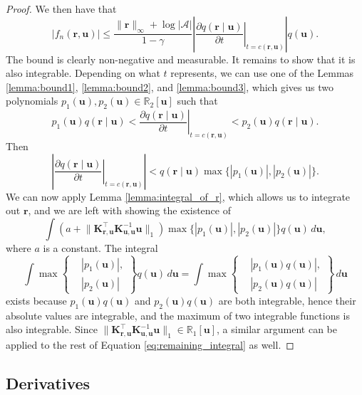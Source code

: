 \documentclass{mpaper}
\newcommand{\vbound}{\frac{\rinf + \log|\mathcal{A}|}{1 - \gamma}}
\newcommand{\rinf}{\lVert \mathbf{r} \rVert_\infty}
\newcommand{\fn}{f_n(\mathbf{r}, \mathbf{u})}
\newcommand{\Kuu}{\mathbf{K}_{\mathbf{u},\mathbf{u}}}
\newcommand{\Kru}{\mathbf{K}_{\mathbf{r},\mathbf{u}}}
\begin{document}
\begin{proof}
  We then have that
  \[
    |\fn| \le \vbound \left| \left. \frac{\partial
          q(\mathbf{r} \mid \mathbf{u})}{\partial t} \right|_{t=c(\mathbf{r}, \mathbf{u})}
    \right| q(\mathbf{u}).
  \]
  The bound is clearly non-negative and measurable. It remains to show that it
  is also integrable. Depending on what $t$ represents, we can use one of the
  Lemmas \ref{lemma:bound1}, \ref{lemma:bound2}, and \ref{lemma:bound3}, which
  gives us two polynomials $p_1(\mathbf{u}), p_2(\mathbf{u}) \in
  \mathbb{R}_2[\mathbf{u}]$ such that
  \[
    p_1(\mathbf{u})q(\mathbf{r} \mid \mathbf{u}) < \left. \frac{\partial q(\mathbf{r} \mid \mathbf{u})}{\partial
        t} \right|_{t=c(\mathbf{r}, \mathbf{u})} < p_2(\mathbf{u})q(\mathbf{r} \mid \mathbf{u}).
  \]
  Then
  \[
    \left| \left. \frac{\partial q(\mathbf{r} \mid \mathbf{u})}{\partial t}
      \right|_{t=c(\mathbf{r}, \mathbf{u})} \right| < q(\mathbf{r} \mid \mathbf{u}) \max \{
    |p_1(\mathbf{u})|, |p_2(\mathbf{u})| \}.
  \]
  We can now apply Lemma \ref{lemma:integral_of_r}, which allows us to integrate
  out $\mathbf{r}$, and we are left with showing the existence of
  \begin{equation} \label{eq:remaining_integral}
    \int \left( a + \lVert \Kru^\intercal \Kuu^{-1} \mathbf{u} \rVert_1 \right) \max \{|p_1(\mathbf{u})|, |p_2(\mathbf{u})| \} q(\mathbf{u})\,d\mathbf{u},
  \end{equation}
  where $a$ is a constant. The integral
  \[
    \int \max \left\{
      \begin{aligned}
        &|p_1(\mathbf{u})|, \\
        &|p_2(\mathbf{u})|
      \end{aligned}
    \right\} q(\mathbf{u})\,d\mathbf{u} = \int \max \left\{
      \begin{aligned}
        &|p_1(\mathbf{u})q(\mathbf{u})|, \\
        &|p_2(\mathbf{u})q(\mathbf{u})|
      \end{aligned}
    \right\}\,d\mathbf{u}
  \]
  exists because $p_1(\mathbf{u})q(\mathbf{u})$ and
  $p_2(\mathbf{u})q(\mathbf{u})$ are both integrable, hence their absolute
  values are integrable, and the maximum of two integrable functions is also
  integrable. Since $\lVert \Kru^\intercal \Kuu^{-1} \mathbf{u} \rVert_1 \in
  \mathbb{R}_1[\mathbf{u}]$, a similar argument can be applied to the rest of
  Equation \ref{eq:remaining_integral} as well.
\end{proof}

\subsection{Derivatives}
\end{document}
